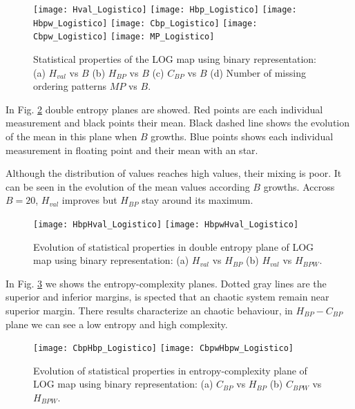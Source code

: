 \begin{figure}
	\texttt{[image: Hval\_Logistico]}
	\texttt{[image: Hbp\_Logistico]}
	\texttt{[image: Hbpw\_Logistico]}
	\texttt{[image: Cbp\_Logistico]}
	\texttt{[image: Cbpw\_Logistico]}
	\texttt{[image: MP\_Logistico]}
	\caption{Statistical properties of the LOG map using binary representation: (a) $H_{val}$ vs $B$ (b) $H_{BP}$ vs $B$ (c) $C_{BP}$ vs $B$ (d) Number of missing ordering patterns $MP$ vs $B$.}
	\label{fig:LOG_QuantiB}
\end{figure}

In Fig. \ref{fig:LOG_HH} double entropy planes are showed.
Red points are each individual measurement and black points their mean.
Black dashed line shows the evolution of the mean in this plane when $B$ growths.
Blue points shows each individual measurement in floating point and their mean with an star.

Although the distribution of values reaches high values, their mixing is poor.
It can be seen in the evolution of the mean values according $B$ growths.
Accross $B=20$, $H_{val}$ improves but $H_{BP}$ stay around its maximum.

\begin{figure}
	\texttt{[image: HbpHval\_Logistico]}
	\texttt{[image: HbpwHval\_Logistico]}
	\caption{Evolution of statistical properties in double entropy plane of LOG map using binary representation: (a) $H_{val}$ vs $H_{BP}$ (b) $H_{val}$ vs $H_{BPW}$.}
	\label{fig:LOG_HH}
\end{figure}

In Fig. \ref{fig:LOG_HC} we shows the entropy-complexity planes.
Dotted gray lines are the superior and inferior margins, is spected that an chaotic system remain near superior margin.
There results characterize an chaotic behaviour, in $H_{BP}-C_{BP}$ plane we can see a low entropy and high complexity.

\begin{figure}
	\texttt{[image: CbpHbp\_Logistico]}
	\texttt{[image: CbpwHbpw\_Logistico]}
	\caption{Evolution of statistical properties in entropy-complexity plane of LOG map using binary representation: (a) $C_{BP}$ vs $H_{BP}$ (b) $C_{BPW}$ vs $H_{BPW}$.}
	\label{fig:LOG_HC}
\end{figure}

